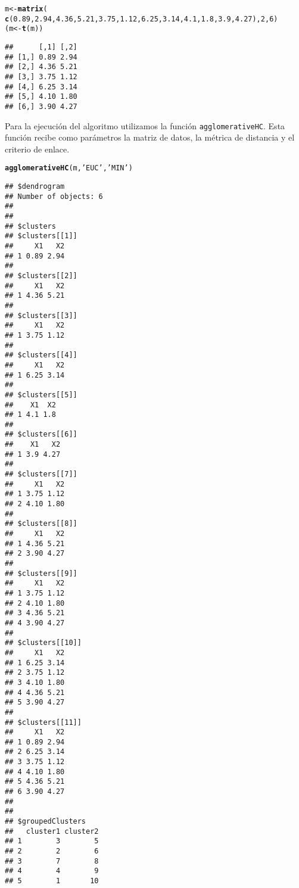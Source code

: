 \documentclass[12pt]{report}\usepackage[]{graphicx}\usepackage[dvipsnames]{xcolor}
\makeatletter
\newcommand{\hlnum}[1]{\textcolor[rgb]{0.686,0.059,0.569}{#1}}%
\newcommand{\hlstr}[1]{\textcolor[rgb]{0.192,0.494,0.8}{#1}}%
\newcommand{\hlstd}[1]{\textcolor[rgb]{0.345,0.345,0.345}{#1}}%
\newcommand{\hlkwb}[1]{\textcolor[rgb]{0.69,0.353,0.396}{#1}}%
\newcommand{\hlkwd}[1]{\textcolor[rgb]{0.737,0.353,0.396}{\textbf{#1}}}%
\newenvironment{kframe}{%
 \def\at@end@of@kframe{}%
 \ifinner\ifhmode%
  \def\at@end@of@kframe{\end{minipage}}%
  \begin{minipage}{\columnwidth}%
 \fi\fi%
 \def\FrameCommand##1{\hskip\@totalleftmargin \hskip-\fboxsep
 \colorbox{shadecolor}{##1}\hskip-\fboxsep
     \hskip-\linewidth \hskip-\@totalleftmargin \hskip\columnwidth}%
 \MakeFramed {\advance\hsize-\width
   \@totalleftmargin\z@ \linewidth\hsize
   \@setminipage}}%
 {\par\unskip\endMakeFramed%
 \at@end@of@kframe}
\newenvironment{knitrout}{}{} %
\makeatother
\begin{document}
\begin{knitrout}
\color{fgcolor}\begin{kframe}
\begin{alltt}
\hlstd{m} \hlkwb{<-} \hlkwd{matrix}\hlstd{(}
        \hlkwd{c}\hlstd{(}\hlnum{0.89}\hlstd{,}\hlnum{2.94}\hlstd{,} \hlnum{4.36}\hlstd{,}\hlnum{5.21}\hlstd{,} \hlnum{3.75}\hlstd{,}\hlnum{1.12}\hlstd{,} \hlnum{6.25}\hlstd{,}\hlnum{3.14}\hlstd{,} \hlnum{4.1}\hlstd{,}\hlnum{1.8}\hlstd{,} \hlnum{3.9}\hlstd{,}\hlnum{4.27}\hlstd{),}\hlnum{2}\hlstd{,}\hlnum{6}\hlstd{)}
\hlstd{(m} \hlkwb{<-} \hlkwd{t}\hlstd{(m))}
\end{alltt}
\begin{verbatim}
##      [,1] [,2]
## [1,] 0.89 2.94
## [2,] 4.36 5.21
## [3,] 3.75 1.12
## [4,] 6.25 3.14
## [5,] 4.10 1.80
## [6,] 3.90 4.27
\end{verbatim}
\end{kframe}
\end{knitrout}
				
				Para la ejecución del algoritmo utilizamos la función \texttt{agglomerativeHC}. Esta función recibe como parámetros la matriz de datos, la métrica de distancia y el criterio de enlace.
				
\begin{knitrout}
\color{fgcolor}\begin{kframe}
\begin{alltt}
\hlkwd{agglomerativeHC}\hlstd{(m,} \hlstr{'EUC'}\hlstd{,} \hlstr{'MIN'}\hlstd{)}
\end{alltt}
\begin{verbatim}
## $dendrogram
## Number of objects: 6 
## 
## 
## $clusters
## $clusters[[1]]
##     X1   X2
## 1 0.89 2.94
## 
## $clusters[[2]]
##     X1   X2
## 1 4.36 5.21
## 
## $clusters[[3]]
##     X1   X2
## 1 3.75 1.12
## 
## $clusters[[4]]
##     X1   X2
## 1 6.25 3.14
## 
## $clusters[[5]]
##    X1  X2
## 1 4.1 1.8
## 
## $clusters[[6]]
##    X1   X2
## 1 3.9 4.27
## 
## $clusters[[7]]
##     X1   X2
## 1 3.75 1.12
## 2 4.10 1.80
## 
## $clusters[[8]]
##     X1   X2
## 1 4.36 5.21
## 2 3.90 4.27
## 
## $clusters[[9]]
##     X1   X2
## 1 3.75 1.12
## 2 4.10 1.80
## 3 4.36 5.21
## 4 3.90 4.27
## 
## $clusters[[10]]
##     X1   X2
## 1 6.25 3.14
## 2 3.75 1.12
## 3 4.10 1.80
## 4 4.36 5.21
## 5 3.90 4.27
## 
## $clusters[[11]]
##     X1   X2
## 1 0.89 2.94
## 2 6.25 3.14
## 3 3.75 1.12
## 4 4.10 1.80
## 5 4.36 5.21
## 6 3.90 4.27
## 
## 
## $groupedClusters
##   cluster1 cluster2
## 1        3        5
## 2        2        6
## 3        7        8
## 4        4        9
## 5        1       10
\end{verbatim}
\end{kframe}
\end{knitrout}
				
\end{document}
